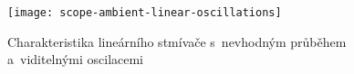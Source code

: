 \begin{figure}[htbp]
    \centering
    \texttt{[image: scope-ambient-linear-oscillations]}
    \caption{%
        Charakteristika lineárního stmívače s~nevhodným průběhem a~viditelnými
        oscilacemi
    }
    \label{fig:ambient linear mereni scope oscilace}
\end{figure}


